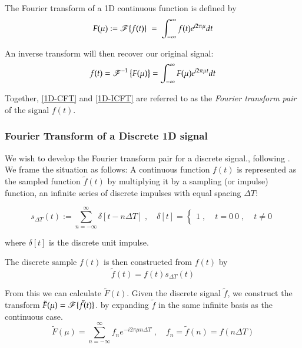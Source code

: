 The Fourier transform of a 1D continuous function is defined by
\begin{equation} \label{1D-CFT}
F(\mu) := \operatorname{\mathscr{F}}\{f(t)\} \;=\; \int_{-\infty}^{\infty} f(t) e^{i2\pi \mu } dt
\end{equation}

An inverse transform will then recover our original signal:
\begin{equation} \label{1D-ICFT}
f(t) = \operatorname{\mathscr{F}}^{-1}\left\{F(\mu)\right\} = \int_{-\infty}^{\infty} F(\mu) e^{i2\pi \mu t} dt
\end{equation}

Together, \cref{1D-CFT} and \cref{1D-ICFT} are referred to as the \textit{Fourier transform pair} of the signal $f(t)$. 

\subsubsection{Fourier Transform of a Discrete 1D signal}

We wish to develop the Fourier transform pair for a discrete signal., following \cite{DIPGW}. We frame the situation
as follows: A continuous function $f(t)$ is represented as the sampled function $\tilde{f}(t)$ by multiplying it by a sampling (or impulse) function, an infinite series of discrete impulses with equal spacing $\Delta T$:

\begin{equation} \label{1D-sampling-function}
s_{\Delta T}(t) := \sum_{n=-\infty}^{\infty} \delta[t - n\Delta T] \;,\quad
\delta[t] = \begin{cases} 1 \;,\; & t=0 \ 0 \;,\;& t \ne 0 \end{cases}
\end{equation}

where $\delta[t]$ is the discrete unit impulse.

The discrete sample $f(t)$ is then constructed from $f(t)$ by
\begin{equation} \label{1D-discrete-sample}
\tilde{f}(t) = f(t) s_{\Delta T}(t)
\end{equation}

From this we can calculate $\tilde{F}(t)$.
Given the discrete signal $\tilde{f}$, we construct the transform
$\tilde{F}(\mu) = \operatorname{\mathscr{F}}\{\tilde{f}(t)\}$. by expanding $\tilde{f}$ in the same infinite basis as the continuous case.
\begin{equation} \label{1D-DFT-transform}
\tilde{F}(\mu) = \sum_{n=-\infty}^{\infty} f_n e^{-i 2\pi \mu n \Delta T} \;,\quad
f_n = \tilde{f}(n) = f(n\Delta T)
\end{equation}

